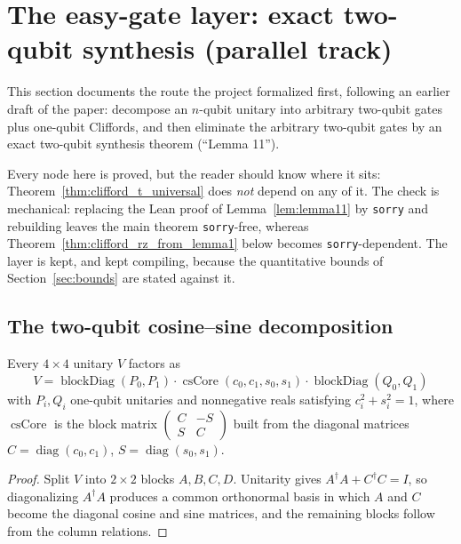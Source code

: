 \section{The easy-gate layer: exact two-qubit synthesis (parallel track)}
\label{sec:easy_gate_layer}

This section documents the route the project formalized first, following an
earlier draft of the paper: decompose an $n$-qubit unitary into arbitrary
two-qubit gates plus one-qubit Cliffords, and then eliminate the arbitrary
two-qubit gates by an exact two-qubit synthesis theorem (``Lemma 11'').

Every node here is proved, but the reader should know where it sits:
Theorem~\ref{thm:clifford_t_universal} does \emph{not} depend on any of it.
The check is mechanical: replacing the Lean proof of Lemma~\ref{lem:lemma11} by
\texttt{sorry} and rebuilding leaves the main theorem \texttt{sorry}-free,
whereas Theorem~\ref{thm:clifford_rz_from_lemma1} below becomes
\texttt{sorry}-dependent.  The layer is kept, and kept compiling, because the
quantitative bounds of Section~\ref{sec:bounds} are stated against it.

\subsection{The two-qubit cosine--sine decomposition}

\begin{lemma}
  \label{lem:cs_square_block}
  \leanok
  Every $4\times 4$ unitary $V$ factors as
  \[
    V = \operatorname{blockDiag}(P_0,P_1)\cdot
        \operatorname{csCore}(c_0,c_1,s_0,s_1)\cdot
        \operatorname{blockDiag}(Q_0,Q_1)
  \]
  with $P_i, Q_i$ one-qubit unitaries and nonnegative reals satisfying
  $c_i^2 + s_i^2 = 1$, where $\operatorname{csCore}$ is the block matrix
  $\begin{pmatrix} C & -S \\ S & C\end{pmatrix}$ built from the diagonal
  matrices $C = \operatorname{diag}(c_0,c_1)$, $S = \operatorname{diag}(s_0,s_1)$.
\end{lemma}

\begin{proof}
  \leanok
  Split $V$ into $2\times2$ blocks $A,B,C,D$.  Unitarity gives
  $A^\dagger A + C^\dagger C = I$, so diagonalizing $A^\dagger A$ produces a
  common orthonormal basis in which $A$ and $C$ become the diagonal cosine and
  sine matrices, and the remaining blocks follow from the column relations.
\end{proof}

